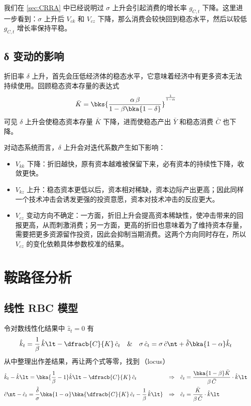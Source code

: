 我们在 \ref{sec:CRRA} 中已经说明过 \(\sigma\) 上升会引起消费的增长率 \(g_{C,t}\) 下降。这里进一步看到：\(\sigma\) 上升后 \(V_{ck}\) 和 \(V_{cz}\) 下降，那么消费会较快回到稳态水平，然后以较低 \(g_{C,t}\) 增长率保持平稳。

\subsection{δ 变动的影响}\label{sec:CompaDelta}

折旧率 \(\delta\) 上升，首先会压低经济体的稳态水平，它意味着经济中有更多资本无法持续使用。回顾稳态资本存量的表达式
\begin{equation*}
    \bar K=\bks{\dfrac{\alpha\,\beta}{1-\beta\bka{1-\delta}}}^{\frac{1}{1-\alpha}}
\end{equation*}
可见 \(\delta\) 上升会使稳态资本存量 \(\bar K\) 下降，进而使稳态产出 \(\bar Y\) 和稳态消费 \(\bar C\) 也下降。

对动态系统而言，\(\delta\) 上升会对迭代系数产生如下影响：
\begin{itemize}
    \item \(V_{kk}\) 下降：折旧越快，原有资本越难被保留下来，必有资本的持续性下降，收敛更快。
    \item \(V_{kz}\) 上升：稳态资本更低以后，资本相对稀缺，资本边际产出更高；因此同样一个技术冲击会诱发更强的投资意愿，资本对技术冲击的反应更大。
    \item \(V_{cz}\) 变动方向不确定：一方面，折旧上升会提高资本稀缺性，使冲击带来的回报更高，从而刺激消费；另一方面，更高的折旧也意味着为了维持资本存量，需要把更多资源留作投资，因此会抑制当期消费。这两个方向同时存在，所以 \(V_{cz}\) 的变化依赖具体参数校准的结果。
\end{itemize}

\section{鞍路径分析}\label{sec:Saddle}

\subsection{线性 RBC 模型}\label{sec:LineSaddleRBC}

令对数线性化结果中 \(\hat z_t=0\) 有
\begin{equation*}
    \hat k_t=\dfrac1\beta\,\hat k\lt-\dfracb{C}{K}\,\hat c_t \quad \& \quad \sigma\,\hat c_t=\sigma\,\hat c\nt+\tilde\delta\bka{1-\alpha}\hat k_t
\end{equation*}
从中整理出作差结果，再让两个式等零，找到\,（locus）
\begin{align}
    & \hat k_t-\hat k\lt=\bka{\dfrac1\beta-1}\hat k\lt-\dfracb{C}{K}\,\hat c_t&\Rightarrow\quad&\hat c_t=\dfrac{\bka{1-\beta}\bar K}{\beta\,\bar C}\cdot\hat k\lt\label{eq:linearsaddle1}\\
    & \hat c\nt-\hat c_t=\dfrac{\tilde\delta}{\sigma}\bka{1-\alpha}\bka{\dfracb{C}{K}\,\hat c_t-\dfrac1\beta\,\hat k\lt}&\Rightarrow\quad&\hat c_t=\dfrac{\bar K}{\beta\,\bar C}\cdot\hat k\lt\label{eq:linearsaddle2}
\end{align}

